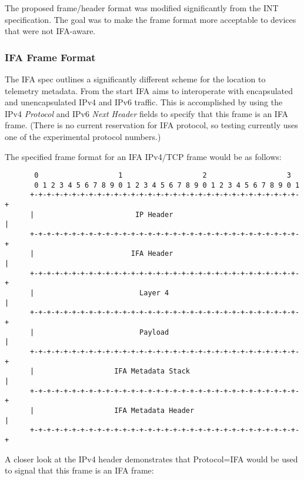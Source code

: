 \documentclass[letterpaper,twocolumn,10pt]{article}
\begin{document}
The proposed frame/header format was modified significantly from the INT
specification.  The goal was to make the frame format more acceptable to
devices that were not IFA-aware.

\subsubsection{IFA Frame Format}
The IFA spec outlines a significantly different scheme for the location
to telemetry metadata.  From the start IFA aims to interoperate with
encapsulated and unencapsulated IPv4 and IPv6 traffic.  This is accomplished by
using the IPv4 \textit{Protocol} and IPv6 \textit{Next Header} fields to
specify that this frame is an IFA frame.  (There is no current reservation for
IFA protocol, so testing currently uses one of the experimental protocol
numbers.)

The specified frame format for an IFA IPv4/TCP frame would be as follows:
\tiny
\begin{center}
\begin{verbatim}
       0                   1                   2                   3
       0 1 2 3 4 5 6 7 8 9 0 1 2 3 4 5 6 7 8 9 0 1 2 3 4 5 6 7 8 9 0 1
      +-+-+-+-+-+-+-+-+-+-+-+-+-+-+-+-+-+-+-+-+-+-+-+-+-+-+-+-+-+-+-+-+
      |                        IP Header                              |
      +-+-+-+-+-+-+-+-+-+-+-+-+-+-+-+-+-+-+-+-+-+-+-+-+-+-+-+-+-+-+-+-+
      |                       IFA Header                              |
      +-+-+-+-+-+-+-+-+-+-+-+-+-+-+-+-+-+-+-+-+-+-+-+-+-+-+-+-+-+-+-+-+
      |                         Layer 4                               |
      +-+-+-+-+-+-+-+-+-+-+-+-+-+-+-+-+-+-+-+-+-+-+-+-+-+-+-+-+-+-+-+-+
      |                         Payload                               |
      +-+-+-+-+-+-+-+-+-+-+-+-+-+-+-+-+-+-+-+-+-+-+-+-+-+-+-+-+-+-+-+-+
      |                   IFA Metadata Stack                          |
      +-+-+-+-+-+-+-+-+-+-+-+-+-+-+-+-+-+-+-+-+-+-+-+-+-+-+-+-+-+-+-+-+
      |                   IFA Metadata Header                         |
      +-+-+-+-+-+-+-+-+-+-+-+-+-+-+-+-+-+-+-+-+-+-+-+-+-+-+-+-+-+-+-+-+
\end{verbatim}
\end{center}
\normalsize

A closer look at the IPv4 header demonstrates that Protocol=IFA would be
used to signal that this frame is an IFA frame:
\end{document}
